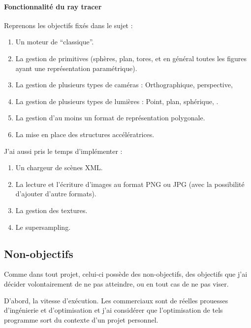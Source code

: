 \paragraph{Fonctionnalité du ray tracer}
Reprenons les objectifs fixés dans le sujet :
\begin{enumerate}
  \item Un moteur de \raytracing ``classique''.\textcolor[rgb]{0.0, 0.9, 0.2}{\checkmark}
  \item La gestion de primitives (sphères, plan, tores, et en général toutes
    les figures ayant une représentation paramétrique).\textcolor[rgb]{0.0, 0.9, 0.2}{\checkmark}
  \item La gestion de plusieurs types de caméras : Orthographique,
    perspective, \etc\textcolor[rgb]{0.0, 0.9, 0.2}{\checkmark}
  \item La gestion de plusieurs types de lumières : Point, plan, sphérique,
    \etc.\textcolor[rgb]{0.0, 0.9, 0.2}{\checkmark}
  \item La gestion d'au moins un format de représentation polygonale.\textcolor[rgb]{0.0, 0.9, 0.2}{\checkmark}
  \item La mise en place des structures accélératrices.\textcolor[rgb]{0.0, 0.9, 0.2}{\checkmark}
\end{enumerate}

\newpar J'ai aussi pris le temps d'implémenter :
\begin{enumerate}
  \item Un chargeur de scènes XML.
  \item La lecture et l'écriture d'images au format PNG ou JPG (avec la
  possibilité d'ajouter d'autre formats).
  \item La gestion des textures.
  \item Le \gls{supersampling}.
\end{enumerate}

\subsection{Non-objectifs}
Comme dans tout projet, celui-ci possède des non-objectifs, \ie des objectifs
que j'ai décider volontairement de ne pas atteindre, ou en tout cas de ne pas
viser. 

\newpar D'abord, la vitesse d'exécution. Les  commerciaux sont
de réelles prouesses d'ingénierie et d'optimisation et j'ai considérer que
l'optimisation de tels programme sort du contexte d'un projet personnel.
